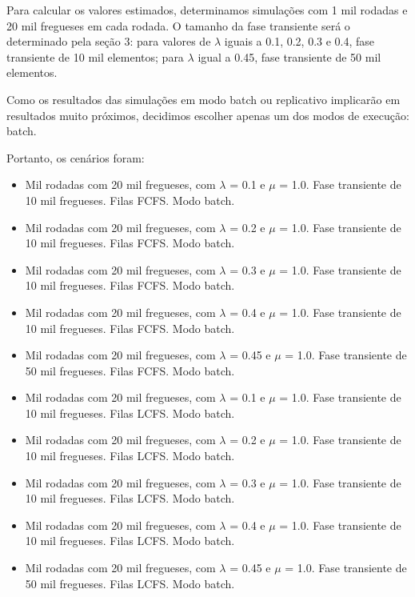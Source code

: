 \documentclass[a4paper,10pt]{article}
\begin{document}
    Para calcular os valores estimados, determinamos simulações com 1 mil rodadas e 20 mil fregueses em cada rodada. O tamanho da fase transiente será o
determinado pela seção 3: para valores de $\lambda$ iguais a 0.1, 0.2, 0.3 e 0.4, fase transiente de 10 mil elementos; para $\lambda$ igual a 0.45,
fase transiente de 50 mil elementos.

    Como os resultados das simulações em modo batch ou replicativo implicarão em resultados muito próximos, decidimos escolher apenas um dos modos de execução:
batch.

    Portanto, os cenários foram:

    \begin{itemize}
		\item Mil rodadas com 20 mil fregueses, com $\lambda$ = 0.1 e $\mu$ = 1.0. Fase transiente de 10 mil fregueses. Filas FCFS. Modo batch.
        \item Mil rodadas com 20 mil fregueses, com $\lambda$ = 0.2 e $\mu$ = 1.0. Fase transiente de 10 mil fregueses. Filas FCFS. Modo batch.
        \item Mil rodadas com 20 mil fregueses, com $\lambda$ = 0.3 e $\mu$ = 1.0. Fase transiente de 10 mil fregueses. Filas FCFS. Modo batch.
        \item Mil rodadas com 20 mil fregueses, com $\lambda$ = 0.4 e $\mu$ = 1.0. Fase transiente de 10 mil fregueses. Filas FCFS. Modo batch.
        \item Mil rodadas com 20 mil fregueses, com $\lambda$ = 0.45 e $\mu$ = 1.0. Fase transiente de 50 mil fregueses. Filas FCFS. Modo batch.
        \item Mil rodadas com 20 mil fregueses, com $\lambda$ = 0.1 e $\mu$ = 1.0. Fase transiente de 10 mil fregueses. Filas LCFS. Modo batch.
        \item Mil rodadas com 20 mil fregueses, com $\lambda$ = 0.2 e $\mu$ = 1.0. Fase transiente de 10 mil fregueses. Filas LCFS. Modo batch.
        \item Mil rodadas com 20 mil fregueses, com $\lambda$ = 0.3 e $\mu$ = 1.0. Fase transiente de 10 mil fregueses. Filas LCFS. Modo batch.
        \item Mil rodadas com 20 mil fregueses, com $\lambda$ = 0.4 e $\mu$ = 1.0. Fase transiente de 10 mil fregueses. Filas LCFS. Modo batch.
        \item Mil rodadas com 20 mil fregueses, com $\lambda$ = 0.45 e $\mu$ = 1.0. Fase transiente de 50 mil fregueses. Filas LCFS. Modo batch.
	\end{itemize}
\end{document}
